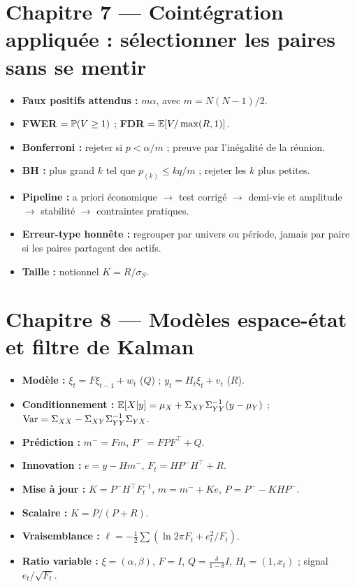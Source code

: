 \section*{Chapitre 7 — Cointégration appliquée : sélectionner les paires sans se mentir}
\begin{itemize}[leftmargin=1.2em,itemsep=0.05em]
\item \textbf{Faux positifs attendus :} $m\alpha$, avec $m = N(N-1)/2$.
\item \textbf{FWER} $=\mathbb{P}(V\ge1)$ ; \textbf{FDR} $=\mathbb{E}[V/\max(R,1)]$.
\item \textbf{Bonferroni :} rejeter si $p < \alpha/m$ ; preuve par l'inégalité de la réunion.
\item \textbf{BH :} plus grand $k$ tel que $p_{(k)}\le kq/m$ ; rejeter les $k$ plus petites.
\item \textbf{Pipeline :} a priori économique $\to$ test corrigé $\to$ demi-vie et amplitude $\to$ stabilité $\to$ contraintes pratiques.
\item \textbf{Erreur-type honnête :} regrouper par univers ou période, jamais par paire si les paires partagent des actifs.
\item \textbf{Taille :} notionnel $K = R/\sigma_S$.
\end{itemize}

\section*{Chapitre 8 — Modèles espace-état et filtre de Kalman}
\begin{itemize}[leftmargin=1.2em,itemsep=0.05em]
\item \textbf{Modèle :} $\xi_t = F\xi_{t-1} + w_t$ ($Q$) ; $y_t = H_t\xi_t + v_t$ ($R$).
\item \textbf{Conditionnement :} $\mathbb{E}[X|y] = \mu_X + \Sigma_{XY}\Sigma_{YY}^{-1}(y-\mu_Y)$ ; $\operatorname{Var} = \Sigma_{XX} - \Sigma_{XY}\Sigma_{YY}^{-1}\Sigma_{YX}$.
\item \textbf{Prédiction :} $m^- = Fm$, $P^- = FPF^\top + Q$.
\item \textbf{Innovation :} $e = y - Hm^-$, $F_t = HP^-H^\top + R$.
\item \textbf{Mise à jour :} $K = P^-H^\top F_t^{-1}$, $m = m^- + Ke$, $P = P^- - KHP^-$.
\item \textbf{Scalaire :} $K = P/(P+R)$.
\item \textbf{Vraisemblance :} $\ell = -\frac12\sum(\ln 2\pi F_t + e_t^2/F_t)$.
\item \textbf{Ratio variable :} $\xi = (\alpha,\beta)$, $F = I$, $Q = \frac\delta{1-\delta}I$, $H_t = (1,x_t)$ ; signal $e_t/\sqrt{F_t}$.
\end{itemize}

